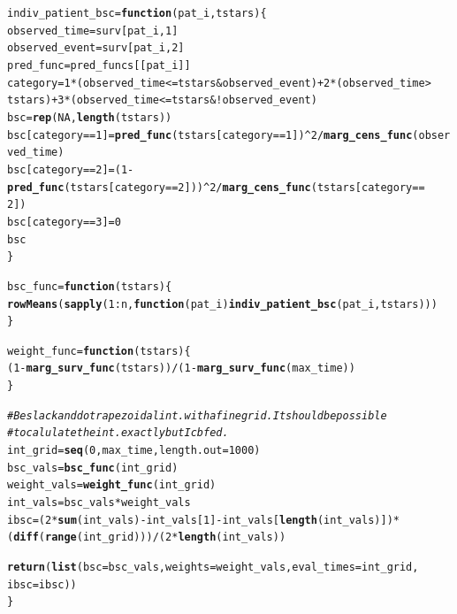 \documentclass{article}\usepackage[]{graphicx}\usepackage[]{color}
\makeatletter
\newcommand{\hlnum}[1]{\textcolor[rgb]{0.686,0.059,0.569}{#1}}%
\newcommand{\hlcom}[1]{\textcolor[rgb]{0.678,0.584,0.686}{\textit{#1}}}%
\newcommand{\hlopt}[1]{\textcolor[rgb]{0,0,0}{#1}}%
\newcommand{\hlstd}[1]{\textcolor[rgb]{0.345,0.345,0.345}{#1}}%
\newcommand{\hlkwa}[1]{\textcolor[rgb]{0.161,0.373,0.58}{\textbf{#1}}}%
\newcommand{\hlkwb}[1]{\textcolor[rgb]{0.69,0.353,0.396}{#1}}%
\newcommand{\hlkwc}[1]{\textcolor[rgb]{0.333,0.667,0.333}{#1}}%
\newcommand{\hlkwd}[1]{\textcolor[rgb]{0.737,0.353,0.396}{\textbf{#1}}}%
\newenvironment{kframe}{%
 \def\at@end@of@kframe{}%
 \ifinner\ifhmode%
  \def\at@end@of@kframe{\end{minipage}}%
  \begin{minipage}{\columnwidth}%
 \fi\fi%
 \def\FrameCommand##1{\hskip\@totalleftmargin \hskip-\fboxsep
 \colorbox{shadecolor}{##1}\hskip-\fboxsep
     \hskip-\linewidth \hskip-\@totalleftmargin \hskip\columnwidth}%
 \MakeFramed {\advance\hsize-\width
   \@totalleftmargin\z@ \linewidth\hsize
   \@setminipage}}%
 {\par\unskip\endMakeFramed%
 \at@end@of@kframe}
\newenvironment{knitrout}{}{} %
\makeatother
\begin{document}
\begin{knitrout}
\begin{kframe}
\begin{alltt}
    \hlstd{indiv_patient_bsc} \hlkwb{=} \hlkwa{function}\hlstd{(}\hlkwc{pat_i}\hlstd{,} \hlkwc{tstars}\hlstd{) \{}
        \hlstd{observed_time} \hlkwb{=} \hlstd{surv[pat_i,} \hlnum{1}\hlstd{]}
        \hlstd{observed_event} \hlkwb{=} \hlstd{surv[pat_i,} \hlnum{2}\hlstd{]}
        \hlstd{pred_func} \hlkwb{=} \hlstd{pred_funcs[[pat_i]]}
        \hlstd{category} \hlkwb{=} \hlnum{1} \hlopt{*} \hlstd{(observed_time} \hlopt{<=} \hlstd{tstars} \hlopt{&} \hlstd{observed_event)} \hlopt{+} \hlnum{2} \hlopt{*} \hlstd{(observed_time} \hlopt{>}
            \hlstd{tstars)} \hlopt{+} \hlnum{3} \hlopt{*} \hlstd{(observed_time} \hlopt{<=} \hlstd{tstars} \hlopt{& !}\hlstd{observed_event)}
        \hlstd{bsc} \hlkwb{=} \hlkwd{rep}\hlstd{(}\hlnum{NA}\hlstd{,} \hlkwd{length}\hlstd{(tstars))}
        \hlstd{bsc[category} \hlopt{==} \hlnum{1}\hlstd{]} \hlkwb{=} \hlkwd{pred_func}\hlstd{(tstars[category} \hlopt{==} \hlnum{1}\hlstd{])}\hlopt{^}\hlnum{2}\hlopt{/}\hlkwd{marg_cens_func}\hlstd{(observed_time)}
        \hlstd{bsc[category} \hlopt{==} \hlnum{2}\hlstd{]} \hlkwb{=} \hlstd{(}\hlnum{1} \hlopt{-} \hlkwd{pred_func}\hlstd{(tstars[category} \hlopt{==} \hlnum{2}\hlstd{]))}\hlopt{^}\hlnum{2}\hlopt{/}\hlkwd{marg_cens_func}\hlstd{(tstars[category} \hlopt{==}
            \hlnum{2}\hlstd{])}
        \hlstd{bsc[category} \hlopt{==} \hlnum{3}\hlstd{]} \hlkwb{=} \hlnum{0}
        \hlstd{bsc}
    \hlstd{\}}

    \hlstd{bsc_func} \hlkwb{=} \hlkwa{function}\hlstd{(}\hlkwc{tstars}\hlstd{) \{}
        \hlkwd{rowMeans}\hlstd{(}\hlkwd{sapply}\hlstd{(}\hlnum{1}\hlopt{:}\hlstd{n,} \hlkwa{function}\hlstd{(}\hlkwc{pat_i}\hlstd{)} \hlkwd{indiv_patient_bsc}\hlstd{(pat_i, tstars)))}
    \hlstd{\}}

    \hlstd{weight_func} \hlkwb{=} \hlkwa{function}\hlstd{(}\hlkwc{tstars}\hlstd{) \{}
        \hlstd{(}\hlnum{1} \hlopt{-} \hlkwd{marg_surv_func}\hlstd{(tstars))}\hlopt{/}\hlstd{(}\hlnum{1} \hlopt{-} \hlkwd{marg_surv_func}\hlstd{(max_time))}
    \hlstd{\}}

    \hlcom{# Be slack and do trapezoidal int. with a fine grid.  It should be possible}
    \hlcom{# to calulate the int. exactly but I cbfed.}
    \hlstd{int_grid} \hlkwb{=} \hlkwd{seq}\hlstd{(}\hlnum{0}\hlstd{, max_time,} \hlkwc{length.out} \hlstd{=} \hlnum{1000}\hlstd{)}
    \hlstd{bsc_vals} \hlkwb{=} \hlkwd{bsc_func}\hlstd{(int_grid)}
    \hlstd{weight_vals} \hlkwb{=} \hlkwd{weight_func}\hlstd{(int_grid)}
    \hlstd{int_vals} \hlkwb{=} \hlstd{bsc_vals} \hlopt{*} \hlstd{weight_vals}
    \hlstd{ibsc} \hlkwb{=} \hlstd{(}\hlnum{2} \hlopt{*} \hlkwd{sum}\hlstd{(int_vals)} \hlopt{-} \hlstd{int_vals[}\hlnum{1}\hlstd{]} \hlopt{-} \hlstd{int_vals[}\hlkwd{length}\hlstd{(int_vals)])} \hlopt{*}
        \hlstd{(}\hlkwd{diff}\hlstd{(}\hlkwd{range}\hlstd{(int_grid)))}\hlopt{/}\hlstd{(}\hlnum{2} \hlopt{*} \hlkwd{length}\hlstd{(int_vals))}

    \hlkwd{return}\hlstd{(}\hlkwd{list}\hlstd{(}\hlkwc{bsc} \hlstd{= bsc_vals,} \hlkwc{weights} \hlstd{= weight_vals,} \hlkwc{eval_times} \hlstd{= int_grid,}
        \hlkwc{ibsc} \hlstd{= ibsc))}
\hlstd{\}}
\end{alltt}
\end{kframe}
\end{knitrout}
\end{document}
